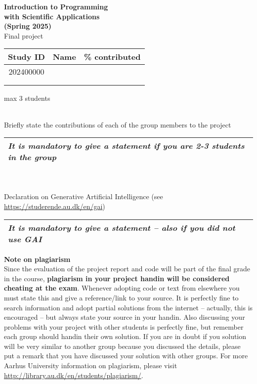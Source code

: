 \documentclass[a4paper, 11pt]{report}
\begin{document}

\thispagestyle{empty}
\setcounter{page}{0}

\begin{center}
  \huge
  \textbf{Introduction to Programming \\
  with Scientific Applications \\
  (Spring 2025)} \\[2ex]
  Final project \\[3ex]
\end{center}
\noindent
\begin{tabularx}{\textwidth}{|c|X|c|}
\multicolumn{1}{c}{Study ID} & 
\multicolumn{1}{l}{Name} & 
\multicolumn{1}{l}{\% contributed} \\
\hline
202400000 & & \\ %
\hline
& & \\ %
\hline
& & \\ %
\hline
\end{tabularx}
\centerline{max 3 students}
\\[2ex]
\noindent
Briefly state the contributions of each of the group members to the project
\\
\begin{tabularx}{\textwidth}{|X|}
\hline
\textit{\color{red}It is mandatory to give a statement if you are 2-3 students in the group}
\\[3cm]
\hline 
\end{tabularx}
\\[2ex]
\noindent
\\
Declaration on Generative Artificial Intelligence (see \url{https://studerende.au.dk/en/gai})
\begin{tabularx}{\textwidth}{|X|}
\hline
\textit{\color{red}It is mandatory to give a statement -- also if you did not use GAI}
\\[3cm]
\hline 
\end{tabularx}


\vfill
\noindent
\textbf{Note on plagiarism} 
\\[2ex]
Since the evaluation of the project report and code will be part of the final grade in the course, \textbf{plagiarism in your project handin will be considered cheating at the exam}. Whenever adopting code or text from elsewhere you must state this and give a reference/link to your source. It is perfectly fine to search information and adopt partial solutions from the internet -- actually, this is encouraged -- but always state your source in your handin. Also discussing your problems with your project with other students is perfectly fine, but remember each group should handin their own solution. If you are in doubt if you solution will be very similar to another group because you discussed the details, please put a remark that you have discussed your solution with other groups. For more Aarhus University information on plagiarism, please visit \url{http://library.au.dk/en/students/plagiarism/}.

\newpage


\end{document}
